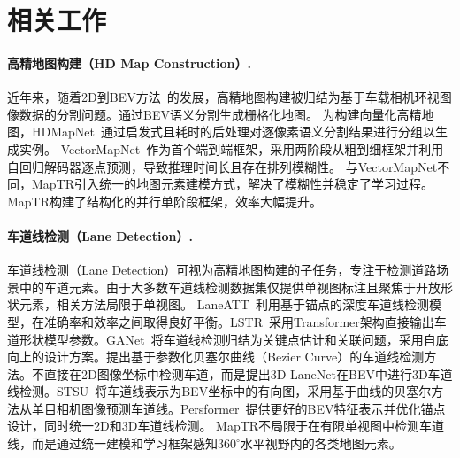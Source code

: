 \documentclass{article} %
\begin{document}
\section{相关工作}
\paragraph{高精地图构建（HD Map Construction）.}
近年来，随着2D到BEV方法~\citep{Ma2022VisionCentricBP}的发展，高精地图构建被归结为基于车载相机环视图像数据的分割问题。\cite{gkt,cvt,fiery,bevformer,lss,polarbev}通过BEV语义分割生成栅格化地图。
为构建向量化高精地图，HDMapNet~\citep{hdmapnet}通过启发式且耗时的后处理对逐像素语义分割结果进行分组以生成实例。
VectorMapNet~\citep{vectormapnet}作为首个端到端框架，采用两阶段从粗到细框架并利用自回归解码器逐点预测，导致推理时间长且存在排列模糊性。
与VectorMapNet不同，MapTR引入统一的地图元素建模方式，解决了模糊性并稳定了学习过程。MapTR构建了结构化的并行单阶段框架，效率大幅提升。




\paragraph{车道线检测（Lane Detection）.}
车道线检测（Lane Detection）可视为高精地图构建的子任务，专注于检测道路场景中的车道元素。由于大多数车道线检测数据集仅提供单视图标注且聚焦于开放形状元素，相关方法局限于单视图。
LaneATT~\citep{tabelini2021keep}利用基于锚点的深度车道线检测模型，在准确率和效率之间取得良好平衡。LSTR~\citep{lstr}采用Transformer架构直接输出车道形状模型参数。GANet~\citep{wang2022keypoint}将车道线检测归结为关键点估计和关联问题，采用自底向上的设计方案。\cite{feng2022rethinking}提出基于参数化贝塞尔曲线（Bezier Curve）的车道线检测方法。\cite{garnett20193d}不直接在2D图像坐标中检测车道，而是提出3D-LaneNet在BEV中进行3D车道线检测。STSU~\citep{can2021structured}将车道线表示为BEV坐标中的有向图，采用基于曲线的贝塞尔方法从单目相机图像预测车道线。Persformer~\citep{chen2022persformer}提供更好的BEV特征表示并优化锚点设计，同时统一2D和3D车道线检测。
MapTR不局限于在有限单视图中检测车道线，而是通过统一建模和学习框架感知$360^\circ$水平视野内的各类地图元素。
\end{document}
